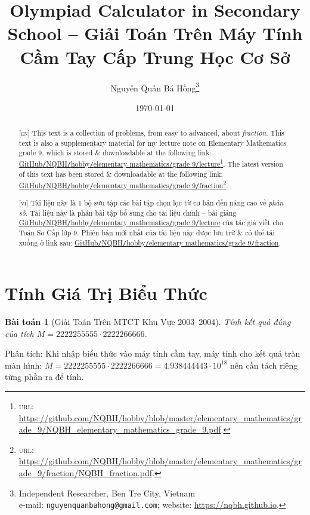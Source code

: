 \documentclass{article}
\title{Olympiad Calculator in Secondary School -- Giải Toán Trên Máy Tính Cầm Tay Cấp Trung Học Cơ Sở}
\author{Nguyễn Quản Bá Hồng\footnote{Independent Researcher, Ben Tre City, Vietnam\\e-mail: \texttt{nguyenquanbahong@gmail.com}; website: \url{https://nqbh.github.io}.}}
\date{\today}
\newtheorem{baitoan}{Bài toán}
\begin{document}
\maketitle
\begin{abstract}
	\textsc{[en]} This text is a collection of problems, from easy to advanced, about \textit{fraction}. This text is also a supplementary material for my lecture note on Elementary Mathematics grade 9, which is stored \& downloadable at the following link: \href{https://github.com/NQBH/hobby/blob/master/elementary_mathematics/grade_9/NQBH_elementary_mathematics_grade_9.pdf}{GitHub\texttt{/}NQBH\texttt{/}hobby\texttt{/}elementary mathematics\texttt{/}grade 9\texttt{/}lecture}\footnote{\textsc{url}: \url{https://github.com/NQBH/hobby/blob/master/elementary_mathematics/grade_9/NQBH_elementary_mathematics_grade_9.pdf}.}. The latest version of this text has been stored \& downloadable at the following link: \href{https://github.com/NQBH/hobby/blob/master/elementary_mathematics/grade_9/fraction/NQBH_fraction.pdf}{GitHub\texttt{/}NQBH\texttt{/}hobby\texttt{/}elementary mathematics\texttt{/}grade 9\texttt{/}fraction}\footnote{\textsc{url}: \url{https://github.com/NQBH/hobby/blob/master/elementary_mathematics/grade_9/fraction/NQBH_fraction.pdf}.}.
	\vspace{2mm}
	
	\textsc{[vi]} Tài liệu này là 1 bộ sưu tập các bài tập chọn lọc từ cơ bản đến nâng cao về \textit{phân số}. Tài liệu này là phần bài tập bổ sung cho tài liệu chính -- bài giảng \href{https://github.com/NQBH/hobby/blob/master/elementary_mathematics/grade_9/NQBH_elementary_mathematics_grade_9.pdf}{GitHub\texttt{/}NQBH\texttt{/}hobby\texttt{/}elementary mathematics\texttt{/}grade 9\texttt{/}lecture} của tác giả viết cho Toán Sơ Cấp lớp 9. Phiên bản mới nhất của tài liệu này được lưu trữ \& có thể tải xuống ở link sau: \href{https://github.com/NQBH/hobby/blob/master/elementary_mathematics/grade_9/fraction/NQBH_fraction.pdf}{GitHub\texttt{/}NQBH\texttt{/}hobby\texttt{/}elementary mathematics\texttt{/}grade 9\texttt{/}fraction}.
\end{abstract}
\tableofcontents
\newpage


\section{Tính Giá Trị Biểu Thức}

\begin{baitoan}[Giải Toán Trên MTCT Khu Vực 2003--2004]
	Tính kết quả đúng của tích $M = 2222255555\cdot2222266666$.
\end{baitoan}
\noindent\textsf{Phân tích}: Khi nhập biểu thức vào máy tính cầm tay, máy tính cho kết quả tràn màn hình: $M = 2222255555\cdot2222266666 = 4.938444443\cdot10^{18}$ nên cần tách riêng từng phần ra để tính.
\end{document}
